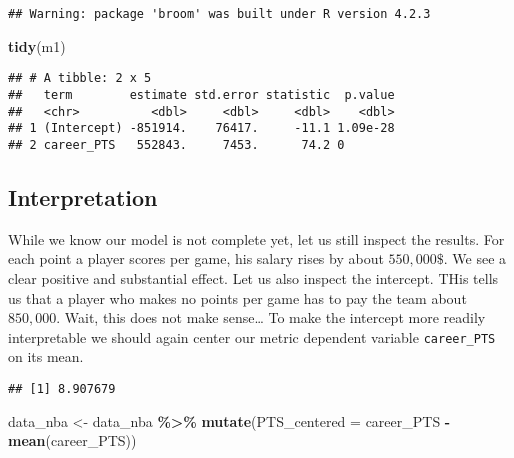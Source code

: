 \documentclass[
]{book}
\newenvironment{Shaded}{\begin{snugshade}}{\end{snugshade}}
\newcommand{\AttributeTok}[1]{\textcolor[rgb]{0.13,0.29,0.53}{#1}}
\newcommand{\FunctionTok}[1]{\textcolor[rgb]{0.13,0.29,0.53}{\textbf{#1}}}
\newcommand{\NormalTok}[1]{#1}
\newcommand{\OtherTok}[1]{\textcolor[rgb]{0.56,0.35,0.01}{#1}}
\newcommand{\SpecialCharTok}[1]{\textcolor[rgb]{0.81,0.36,0.00}{\textbf{#1}}}
\begin{document}
\begin{verbatim}
## Warning: package 'broom' was built under R version 4.2.3
\end{verbatim}

\begin{Shaded}
\begin{Highlighting}[]
\FunctionTok{tidy}\NormalTok{(m1)}
\end{Highlighting}
\end{Shaded}

\begin{verbatim}
## # A tibble: 2 x 5
##   term        estimate std.error statistic  p.value
##   <chr>          <dbl>     <dbl>     <dbl>    <dbl>
## 1 (Intercept) -851914.    76417.     -11.1 1.09e-28
## 2 career_PTS   552843.     7453.      74.2 0
\end{verbatim}

\hypertarget{interpretation-1}{%
\subsection{Interpretation}\label{interpretation-1}}

While we know our model is not complete yet, let us still inspect the results.
For each point a player scores per game, his salary rises by about \(550,000\$\).
We see a clear positive and substantial effect. Let us also inspect the
intercept. THis tells us that a player who makes no points per game has to pay
the team about \(850,000\). Wait, this does not make sense\ldots{}
To make the intercept more readily interpretable we should again center our
metric dependent variable \texttt{career\_PTS} on its mean.

\begin{Shaded}
\end{Shaded}

\begin{verbatim}
## [1] 8.907679
\end{verbatim}

\begin{Shaded}
\begin{Highlighting}[]
\NormalTok{data\_nba }\OtherTok{\textless{}{-}}\NormalTok{ data\_nba }\SpecialCharTok{\%\textgreater{}\%} 
  \FunctionTok{mutate}\NormalTok{(}\AttributeTok{PTS\_centered =}\NormalTok{ career\_PTS }\SpecialCharTok{{-}} \FunctionTok{mean}\NormalTok{(career\_PTS))}
\end{Highlighting}
\end{Shaded}
\end{document}
